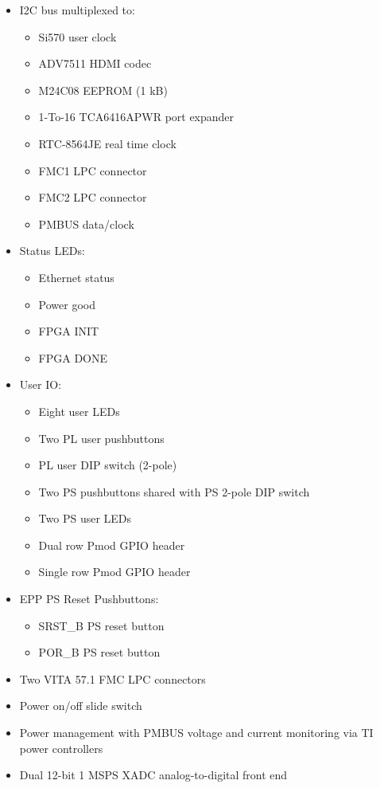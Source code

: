 \begin{itemize}
    \item \gls{I2C} bus multiplexed to:
    \begin{itemize}
        \item Si570 user clock
        \item ADV7511 \gls{HDMI} codec
        \item M24C08 \gls{EEPROM} (1 kB)
        \item 1-To-16 TCA6416APWR port expander
        \item RTC-8564JE real time clock
        \item FMC1 LPC connector
        \item FMC2 LPC connector
        \item \gls{PMBUS} data/clock
    \end{itemize}
    \item Status \glspl{LED}:
    \begin{itemize}
        \item Ethernet status
        \item Power good
        \item FPGA INIT
        \item FPGA DONE
    \end{itemize}
    \item User \gls{IO}:
    \begin{itemize}
        \item Eight user \glspl{LED}
        \item Two \gls{PL} user pushbuttons
        \item \gls{PL} user \gls{DIP} switch (2-pole)
        \item Two \gls{PS} pushbuttons shared with \gls{PS} 2-pole \gls{DIP}
            switch
        \item Two \gls{PS} user \glspl{LED}
        \item Dual row Pmod \gls{GPIO} header
        \item Single row Pmod \gls{GPIO} header
    \end{itemize}
    \item \gls{EPP} \gls{PS} Reset Pushbuttons:
    \begin{itemize}
        \item SRST_B \gls{PS} reset button
        \item POR_B \gls{PS} reset button
    \end{itemize}
    \item Two VITA 57.1 FMC LPC connectors
    \item Power on/off slide switch
    \item Power management with \gls{PMBUS} voltage and current monitoring via
        TI power controllers
    \item Dual 12-bit 1 MSPS XADC analog-to-digital front end
    

\end{itemize}
